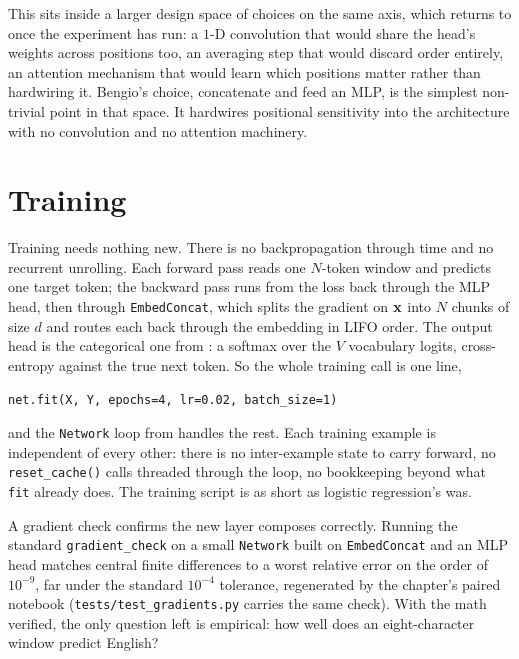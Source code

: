 This sits inside a larger design space of choices on the same axis, which
 returns to once the experiment has run: a $1$-D
convolution that would share the head's weights across positions too, an
averaging step that would discard order entirely, an attention mechanism
that would learn which positions matter rather than hardwiring it. Bengio's
choice, concatenate and feed an MLP, is the simplest non-trivial point in
that space. It hardwires positional sensitivity into the architecture with
no convolution and no attention machinery.

\section{Training}\label{sec:bengio-training}

Training needs nothing new. There is no backpropagation through time and no
recurrent unrolling. Each forward pass reads one $N$-token window and
predicts one target token; the backward pass runs from the loss back
through the MLP head, then through \texttt{EmbedConcat}, which splits the
gradient on $\mathbf{x}$ into $N$ chunks of size $d$ and routes each back through
the embedding in LIFO order. The output head is the categorical one from
: a softmax over the $V$ vocabulary logits, cross-entropy
against the true next token. So the whole training call is one line,
\begin{lstlisting}
net.fit(X, Y, epochs=4, lr=0.02, batch_size=1)
\end{lstlisting}
and the \texttt{Network} loop from  handles the rest.
Each training example is independent of every other: there is no
inter-example state to carry forward, no \texttt{reset\_cache()} calls
threaded through the loop, no bookkeeping beyond what \texttt{fit} already
does. The training script is as short as logistic regression's was.

A gradient check confirms the new layer composes correctly. Running the
standard \texttt{gradient\_check} on a small \texttt{Network} built on
\texttt{EmbedConcat} and an MLP head matches central finite differences to
a worst relative error on the order of $10^{-9}$, far under the standard
$10^{-4}$ tolerance, regenerated by the chapter's paired notebook
(\texttt{tests/test\_gradients.py} carries the same check). With the math
verified, the only question left is empirical: how well does an
eight-character window predict English?
